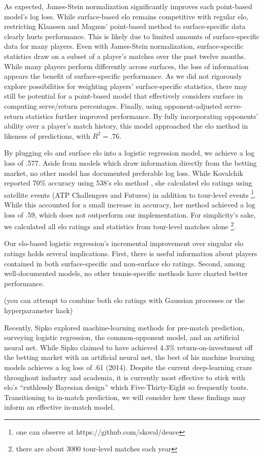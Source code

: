 \documentclass[chapterprefix=false]{report}
\begin{document}
As expected, James-Stein normalization significantly improves each point-based model's log loss. While surface-based elo remains competitive with regular elo, restricting Klaassen and Magnus' point-based method to surface-specific data clearly hurts performance. This is likely due to limited amounts of surface-specific data for many players. Even with James-Stein normalization, surface-specific statistics draw on a subset of a player's matches over the past twelve months. While many players perform differently across surfaces, the loss of information appears the benefit of surface-specific performance. As we did not rigorously explore possibilities for weighting players' surface-specific statistics, there may still be potential for a point-based model that effectively considers surface in computing serve/return percentages. Finally, using opponent-adjusted serve-return statistics further improved performance. By fully incorporating opponents' ability over a player's match history, this model approached the elo method in likeness of predictions, with $R^2=.76$.

By plugging elo and surface elo into a logistic regression model, we achieve a log loss of .577. Aside from models which draw information directly from the betting market, no other model has documented preferable log loss. While Kovalchik reported 70$\%$ accuracy using 538's elo method \cite{Kovalchik2016}, she calculated elo ratings using satellite events (ATP Challengers and Futures) in addition to tour-level events \footnote{one can observe at https://github.com/skoval/deuce}. While this accounted for a small increase in accuracy, her method achieved a log loss of .59, which does not outperform our implementation. For simplicity's sake, we calculated all elo ratings and statistics from tour-level matches alone \footnote{there are about 3000 tour-level matches each year}.


Our elo-based logistic regression's incremental improvement over singular elo ratings holds several implications. First, there is useful information about players contained in both surface-specific and non-surface elo ratings. Second, among well-documented models, no other tennis-specific methods have charted better performance. 

(you can attempt to combine both elo ratings with Gaussian processes or the hyperparameter hack)

Recently, Sipko explored machine-learning methods for pre-match prediction, surveying logistic regression, the common-opponent model, and an artificial neural net. While Sipko claimed to have achieved 4.3$\%$ return-on-investment off the betting market with an artificial neural net, the best of his machine learning models achieves a log loss of .61 (2014). Despite the current deep-learning craze throughout industry and academia, it is currently most effective to stick with elo's ``ruthlessly Bayesian design'' which Five-Thirty-Eight so frequently touts. Transitioning to in-match prediction, we will consider how these findings may inform an effective in-match model.
\end{document}
